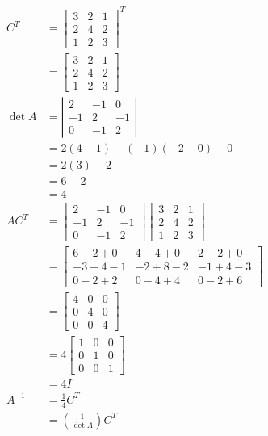 \documentclass[main.tex]{subfiles}
\begin{document}
\begin{enumerate}
    $$
    \begin{aligned}
    C^{T} &=\left[\begin{array}{lll}
    3 & 2 & 1 \\
    2 & 4 & 2 \\
    1 & 2 & 3
    \end{array}\right]^{T} \\
    &=\left[\begin{array}{lll}
    3 & 2 & 1 \\
    2 & 4 & 2 \\
    1 & 2 & 3
    \end{array}\right] \\
    \operatorname{det} A &=\left|\begin{array}{ccc}
    2 & -1 & 0 \\
    -1 & 2 & -1 \\
    0 & -1 & 2
    \end{array}\right| \\
    &=2(4-1)-(-1)(-2-0)+0 \\
    &=2(3)-2 \\
    &=6-2 \\
    &=4 \\
    A C^{T} &=\left[\begin{array}{ccc}
    2 & -1 & 0 \\
    -1 & 2 & -1 \\
    0 & -1 & 2
    \end{array}\right]\left[\begin{array}{ccc}
    3 & 2 & 1 \\
    2 & 4 & 2 \\
    1 & 2 & 3
    \end{array}\right] \\
    &=\left[\begin{array}{ccc}
    6-2+0 & 4-4+0 & 2-2+0 \\
    -3+4-1 & -2+8-2 & -1+4-3 \\
    0-2+2 & 0-4+4 & 0-2+6
    \end{array}\right] \\
    &=\left[\begin{array}{ccc}
    4 & 0 & 0 \\
    0 & 4 & 0 \\
    0 & 0 & 4
    \end{array}\right] \\
    &=4\left[\begin{array}{ccc}
    1 & 0 & 0 \\
    0 & 1 & 0 \\
    0 & 0 & 1
    \end{array}\right] \\
    &=4 I \\
    A^{-1} &=\frac{1}{4} C^{T} \\
    &=\left(\frac{1}{\operatorname{det} A}\right) C^{T}
    \end{aligned}
    $$
    

\end{enumerate}
\end{document}
